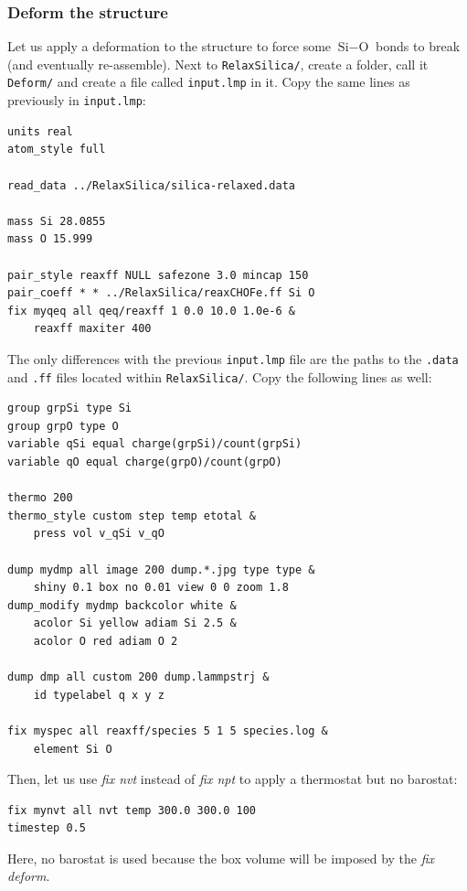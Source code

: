 \documentclass[9pt,tutorial]{livecoms}
\newcommand{\flrcmd}[1]{\textcolor{command}{\texttt{#1}}} %
\newcommand{\flecmd}[1]{\textcolor{command}{\texttt{#1}}} %
\begin{document}
\subsubsection{Deform the structure}
Let us apply a deformation to the structure to force some $\text{Si}-\text{O}$
bonds to break (and eventually re-assemble). Next to \flrcmd{RelaxSilica/},
create a folder, call it \flrcmd{Deform/} and create a file called \flecmd{input.lmp}
in it. Copy the same lines as previously in \flecmd{input.lmp}:
\begin{lstlisting}
units real
atom_style full

read_data ../RelaxSilica/silica-relaxed.data

mass Si 28.0855
mass O 15.999

pair_style reaxff NULL safezone 3.0 mincap 150
pair_coeff * * ../RelaxSilica/reaxCHOFe.ff Si O
fix myqeq all qeq/reaxff 1 0.0 10.0 1.0e-6 &
    reaxff maxiter 400
\end{lstlisting}
The only differences with the previous \flecmd{input.lmp} file are the paths to
the \flecmd{.data} and \flecmd{.ff} files located within \flrcmd{RelaxSilica/}.
Copy the following lines as well:
\begin{lstlisting}
group grpSi type Si
group grpO type O
variable qSi equal charge(grpSi)/count(grpSi)
variable qO equal charge(grpO)/count(grpO)

thermo 200
thermo_style custom step temp etotal &
    press vol v_qSi v_qO

dump mydmp all image 200 dump.*.jpg type type &
    shiny 0.1 box no 0.01 view 0 0 zoom 1.8
dump_modify mydmp backcolor white &
    acolor Si yellow adiam Si 2.5 &
    acolor O red adiam O 2

dump dmp all custom 200 dump.lammpstrj &
    id typelabel q x y z

fix myspec all reaxff/species 5 1 5 species.log &
    element Si O
\end{lstlisting}
Then, let us use \textit{fix nvt} instead of \textit{fix npt} to apply a
thermostat but no barostat:
\begin{lstlisting}
fix mynvt all nvt temp 300.0 300.0 100
timestep 0.5
\end{lstlisting}
Here, no barostat is used because the box volume will be imposed by the \textit{fix deform}.
\end{document}
